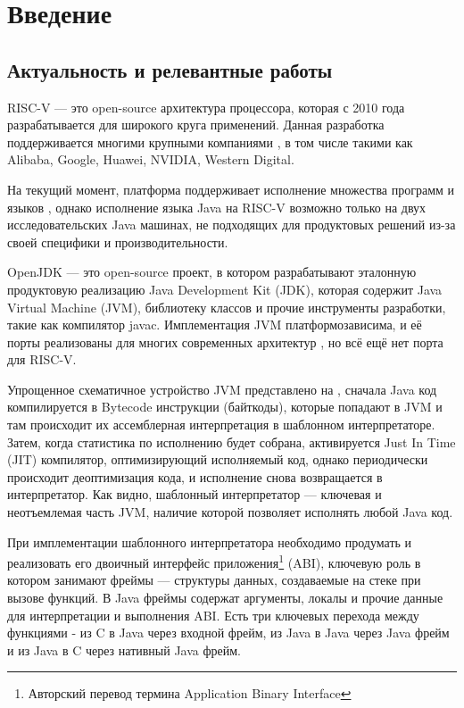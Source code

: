 \section*{Введение}
\renewcommand{\thefigure}{\arabic{figure}}
\subsection*{Актуальность и релевантные работы}

RISC-V --- это open-source архитектура процессора, которая с 2010 года разрабатывается для широкого круга применений. Данная разработка поддерживается многими крупными компаниями \cite{riscv:members}, в том числе такими как Alibaba, Google, Huawei, NVIDIA, Western Digital.

На текущий момент, платформа поддерживает исполнение множества программ и языков \cite{riscv:soft}, однако исполнение языка Java на RISC-V возможно только на двух исследовательских Java машинах, не подходящих для продуктовых решений из-за своей специфики и производительности.

OpenJDK --- это open-source проект, в котором разрабатывают эталонную \cite{openjdk_reference, openjdk:FAQ} продуктовую реализацию Java Development Kit (JDK), которая содержит Java Virtual Machine (JVM), библиотеку классов и прочие инструменты разработки, такие как компилятор javac. Имплементация JVM платформозависима, и её порты реализованы для многих современных архитектур \cite{openjdk:platforms}, но всё ещё нет порта для RISC-V.


Упрощенное схематичное устройство JVM представлено на , сначала Java код компилируется в Bytecode инструкции (байткоды), которые попадают в JVM и там происходит их ассемблерная интерпретация в шаблонном интерпретаторе. Затем, когда статистика по исполнению будет собрана, активируется Just In Time (JIT) компилятор, оптимизирующий исполняемый код, однако периодически происходит деоптимизация кода, и исполнение снова возвращается в интерпретатор. Как видно, шаблонный интерпретатор --- ключевая и неотъемлемая часть JVM, наличие которой позволяет исполнять любой Java код.

При имплементации шаблонного интерпретатора необходимо продумать и реализовать его двоичный интерфейс приложения\footnote{Авторский перевод термина Application Binary Interface} (ABI), ключевую роль в котором занимают фреймы --- структуры данных, создаваемые на стеке при вызове функций. В Java фреймы содержат аргументы, локалы и прочие данные для интерпретации и выполнения ABI. Есть три ключевых перехода между функциями - из C в Java через входной фрейм, из Java в Java через Java фрейм и из Java в C через нативный Java фрейм.



